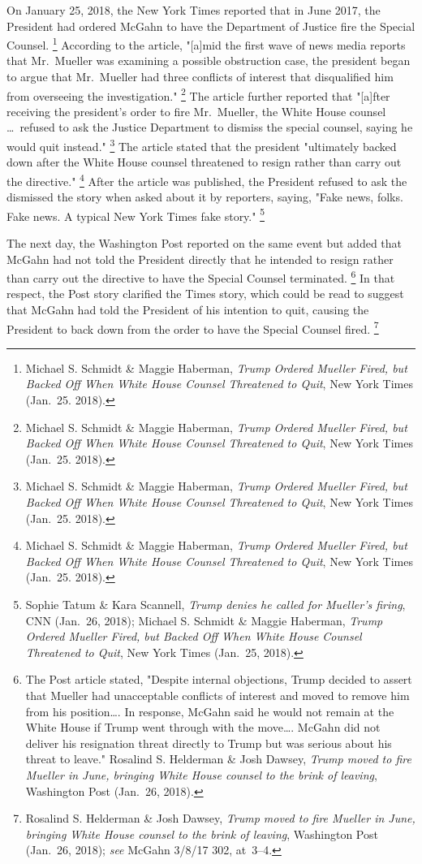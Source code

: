{On January 25, 2018, the New York Times reported that in June 2017, the President had ordered McGahn to have the Department of Justice fire the Special Counsel.%
\footnote{Michael S. Schmidt \& Maggie Haberman, \textit{Trump Ordered Mueller Fired, but Backed Off When White House Counsel Threatened to Quit}, New York Times (Jan.~25. 2018).}
According to the article, "[a]mid the first wave of news media reports that Mr.~Mueller was examining a possible obstruction case, the president began to argue that Mr.~Mueller had three conflicts of interest that disqualified him from overseeing the investigation."%
\footnote{Michael S. Schmidt \& Maggie Haberman, \textit{Trump Ordered Mueller Fired, but Backed Off When White House Counsel Threatened to Quit}, New York Times (Jan.~25. 2018).}
The article further reported that "[a]fter receiving the president's order to fire Mr.~Mueller, the White House counsel \dots\ refused to ask the Justice Department to dismiss the special counsel, saying he would quit instead."%
\footnote{Michael S. Schmidt \& Maggie Haberman, \textit{Trump Ordered Mueller Fired, but Backed Off When White House Counsel Threatened to Quit}, New York Times (Jan.~25. 2018).}
The article stated that the president "ultimately backed down after the White House counsel threatened to resign rather than carry out the directive."%
\footnote{Michael S. Schmidt \& Maggie Haberman, \textit{Trump Ordered Mueller Fired, but Backed Off When White House Counsel Threatened to Quit}, New York Times (Jan.~25. 2018).}
After the article was published, the President
refused to ask the
dismissed the story when asked about it by reporters, saying, "Fake news, folks.
Fake news.
A typical New York Times fake story."%
\footnote{Sophie Tatum \& Kara Scannell, \textit{Trump denies he called for Mueller's firing}, CNN (Jan.~26, 2018);
Michael S. Schmidt \& Maggie Haberman, \textit{Trump Ordered Mueller Fired, but Backed Off When White House Counsel Threatened to Quit}, New York Times (Jan.~25, 2018).}

The next day, the Washington Post reported on the same event but added that McGahn had not told the President directly that he intended to resign rather than carry out the directive to have the Special Counsel terminated.%
\footnote{The Post article stated, "Despite internal objections, Trump decided to assert that Mueller had unacceptable conflicts of interest and moved to remove him from his position\dots.
In response, McGahn said he would not remain at the White House if Trump went through with the move\dots.
McGahn did not deliver his resignation threat directly to Trump but was serious about his threat to leave."
Rosalind S. Helderman \& Josh Dawsey, \textit{Trump moved to fire Mueller in June, bringing White House counsel to the brink of leaving}, Washington Post (Jan.~26, 2018).}
In that respect, the Post story clarified the Times story, which could be read to suggest that McGahn had told the President of his intention to quit, causing the President to back down from the order to have the Special Counsel fired.%
\footnote{Rosalind S. Helderman \& Josh Dawsey, \textit{Trump moved to fire Mueller in June, bringing White House counsel to the brink of leaving}, Washington Post (Jan.~26, 2018);
\textit{see} McGahn 3/8/17 302, at~3--4.}

}
